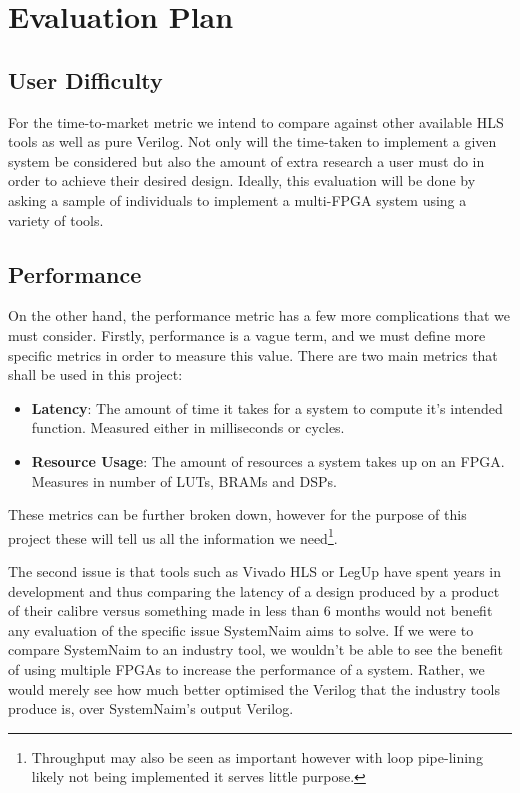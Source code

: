 \chapter{Evaluation Plan}
\label{chap:Eval}

\section{User Difficulty}
For the time-to-market metric we intend to compare against other available HLS tools as well as pure Verilog. Not only will the time-taken to implement a given system be considered but also the amount of extra research a user must do in order to achieve their desired design. Ideally, this evaluation will be done by asking a sample of individuals to implement a multi-FPGA system using a variety of tools.

\section{Performance}
On the other hand, the performance metric has a few more complications that we must consider. Firstly, performance is a vague term, and we must define more specific metrics in order to measure this value. There are two main metrics that shall be used in this project: 

\begin{itemize}
    \item \textbf{Latency}: The amount of time it takes for a system to compute it's intended function. Measured either in milliseconds or cycles.
    \item \textbf{Resource Usage}: The amount of resources a system takes up on an FPGA. Measures in number of LUTs, BRAMs and DSPs.
\end{itemize}

These metrics can be further broken down, however for the purpose of this project these will tell us all the information we need\footnote{Throughput may also be seen as important however with loop pipe-lining likely not being implemented it serves little purpose.}.

The second issue is that tools such as Vivado HLS or LegUp have spent years in development and thus comparing the latency of a design produced by a product of their calibre versus something made in less than 6 months would not benefit any evaluation of the specific issue SystemNaim aims to solve. If we were to compare SystemNaim to an industry tool, we wouldn't be able to see the benefit of using multiple FPGAs to increase the performance of a system. Rather, we would merely see how much better optimised the Verilog that the industry tools produce is, over SystemNaim's output Verilog.

